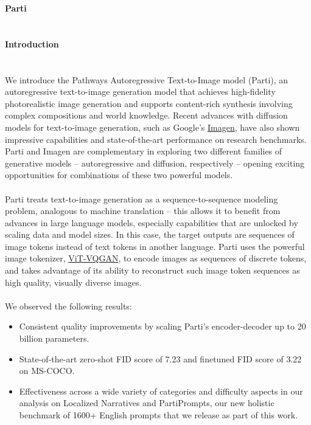 \documentclass{article}
\begin{document}
{\noindent \Huge \textbf{Parti}}\\\\
\\
{\noindent \LARGE \textbf{Introduction}}\\\\
\\
We introduce the Pathways Autoregressive Text-to-Image model (Parti), an autoregressive text-to-image generation model that achieves high-fidelity photorealistic image generation and supports content-rich synthesis involving complex compositions and world knowledge. Recent advances with diffusion models for text-to-image generation, such as Google’s \href{https://imagen.research.google/}{Imagen}, have also shown impressive capabilities and state-of-the-art performance on research benchmarks. Parti and Imagen are complementary in exploring two different families of generative models – autoregressive and diffusion, respectively – opening exciting opportunities for combinations of these two powerful models.\\
\\
Parti treats text-to-image generation as a sequence-to-sequence modeling problem, analogous to machine translation – this allows it to benefit from advances in large language models, especially capabilities that are unlocked by scaling data and model sizes. In this case, the target outputs are sequences of image tokens instead of text tokens in another language. Parti uses the powerful image tokenizer, \href{https://doi.org/10.48550/arXiv.2110.04627}{ViT-VQGAN}, to encode images as sequences of discrete tokens, and takes advantage of its ability to reconstruct such image token sequences as high quality, visually diverse images.\\
\\
We observed the following results:\\
\begin{itemize}
	\item Consistent quality improvements by scaling Parti’s encoder-decoder up to 20 billion parameters.
	\item State-of-the-art zero-shot FID score of 7.23 and finetuned FID score of 3.22 on MS-COCO.
	\item Effectiveness across a wide variety of categories and difficulty aspects in our analysis on Localized Narratives and PartiPrompts, our new holistic benchmark of 1600+ English prompts that we release as part of this work.
\end{itemize}
\\
\end{document}
